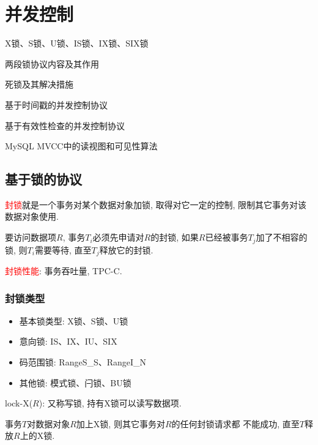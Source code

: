\chapter{并发控制}

\begin{introduction}[期末考试提纲]
  \item X锁、S锁、U锁、IS锁、IX锁、SIX锁
  \item 两段锁协议内容及其作用
  \item 死锁及其解决措施
  \item 基于时间戳的并发控制协议
  \item 基于有效性检查的并发控制协议
  \item MySQL MVCC中的读视图和可见性算法
\end{introduction}

\section{基于锁的协议}

\begin{definition}[封锁]
  \textcolor{red}{封锁}就是一个事务对某个数据对象加锁, 取得对它一定的控制, 限制其它事务对该数据对象使用.
  
  要访问数据项$R$, 事务$T_i$必须先申请对$R$的封锁, 如果$R$已经被事务$T_j$加了不相容的锁, 则$T_i$需要等待, 直至$T_j$释放它的封锁.
\end{definition}

\textcolor{red}{封锁性能}: 事务吞吐量, TPC-C.

\subsection{封锁类型}

\begin{itemize}
  \item 基本锁类型: X锁、S锁、U锁
  \item 意向锁: IS、IX、IU、SIX
  \item 码范围锁: RangeS\_S、RangeI\_N
  \item 其他锁: 模式锁、闩锁、BU锁
\end{itemize}

\begin{definition}
  lock-X($R$): 又称写锁, 持有X锁可以读写数据项.

  事务$T$对数据对象$R$加上X锁, 则其它事务对$R$的任何封锁请求都
不能成功, 直至$T$释放$R$上的X锁.
\end{definition}

